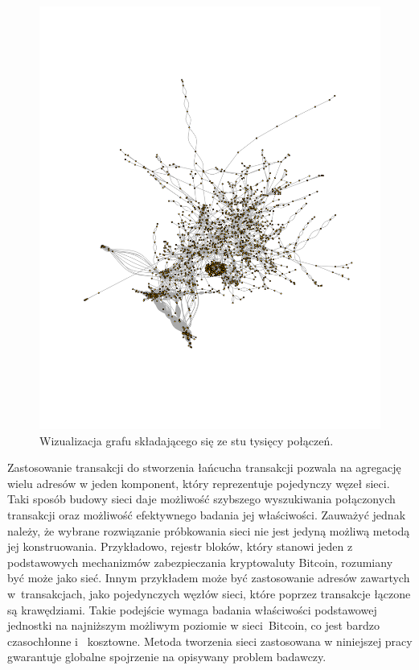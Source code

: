 \documentclass[12pt, twoside, final, openany]{mgr}
\begin{document}
\begin{figure}[H]
\begin{center}
\centering
\includegraphics[width=1\linewidth]{pictures/graph/graph.png}
\caption{Wizualizacja grafu składającego się ze stu tysięcy połączeń.}
\label{fig:graf}
\end{center}
\end{figure}

\newpage
\indent Zastosowanie transakcji do stworzenia łańcucha transakcji pozwala na agregację wielu adresów w jeden komponent, który reprezentuje pojedynczy węzeł sieci. Taki sposób budowy sieci  daje możliwość szybszego wyszukiwania połączonych transakcji oraz możliwość efektywnego badania jej właściwości. Zauważyć jednak należy, że wybrane rozwiązanie próbkowania sieci nie jest jedyną możliwą metodą jej konstruowania. Przykładowo, rejestr bloków, który stanowi jeden z podstawowych mechanizmów zabezpieczania kryptowaluty Bitcoin, rozumiany być może jako sieć. Innym przykładem może być zastosowanie adresów zawartych w~transakcjach, jako pojedynczych węzłów sieci, które poprzez transakcje łączone są krawędziami. Takie podejście wymaga badania właściwości podstawowej jednostki na najniższym możliwym poziomie w sieci~Bitcoin, co jest bardzo czasochłonne i~ kosztowne. Metoda tworzenia sieci zastosowana w niniejszej pracy gwarantuje globalne spojrzenie na opisywany problem badawczy. 
\end{document}
